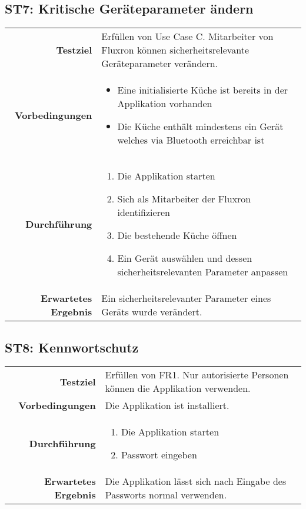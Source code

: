 \subsection{ST7: Kritische Geräteparameter ändern}
\begin{table}[H]
\begin{tabularx}{\textwidth}{r X }
\textbf{Testziel} & Erfüllen von Use Case C. Mitarbeiter von Fluxron können sicherheitsrelevante Geräteparameter verändern. \\
\textbf{Vorbedingungen} & \begin{itemize}
\item Eine initialisierte Küche ist bereits in der Applikation vorhanden
\item Die Küche enthält mindestens ein Gerät welches via Bluetooth erreichbar ist
\end{itemize} \\
\textbf{Durchführung} & \begin{enumerate}
\item Die Applikation starten
\item Sich als Mitarbeiter der Fluxron identifizieren
\item Die bestehende Küche öffnen
\item Ein Gerät auswählen und dessen sicherheitsrelevanten Parameter anpassen
\end{enumerate} \\
\textbf{Erwartetes Ergebnis} & Ein sicherheitsrelevanter Parameter eines Geräts wurde verändert.\\
\end{tabularx}
\end{table}

\subsection{ST8: Kennwortschutz}
\begin{table}[H]
\begin{tabularx}{\textwidth}{r X }
\textbf{Testziel} & Erfüllen von \ac{FR}1. Nur autorisierte Personen können die Applikation verwenden.\\
\textbf{Vorbedingungen} & Die Applikation ist installiert.\\
\textbf{Durchführung} & \begin{enumerate}
\item Die Applikation starten
\item Passwort eingeben
\end{enumerate} \\
\textbf{Erwartetes Ergebnis} & Die Applikation lässt sich nach Eingabe des Passworts normal verwenden.\\
\end{tabularx}
\end{table}

